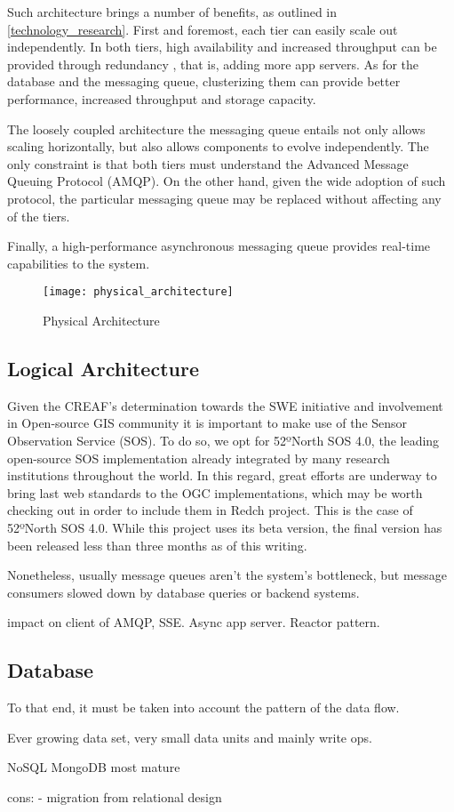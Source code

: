 Such architecture brings a number of benefits, as outlined in \ref{technology_research}. First and foremost, each tier can easily scale out independently. In both tiers, high availability and increased throughput can be provided through redundancy \cite{Antwerp}, that is, adding more app servers. As for the database and the messaging queue, clusterizing them can provide better performance, increased throughput and storage capacity.

The loosely coupled architecture the messaging queue entails not only allows scaling horizontally, but also allows components to evolve independently. The only constraint is that both tiers must understand the Advanced Message Queuing Protocol (AMQP). On the other hand, given the wide adoption of such protocol, the particular messaging queue may be replaced without affecting any of the tiers.

Finally, a high-performance asynchronous messaging queue provides real-time capabilities to the system.

\begin{figure}[ht]
	\centering
	\texttt{[image: physical\_architecture]}
	\caption{Physical Architecture}
	\label{fig:physical_architecture}
\end{figure}

\subsection{Logical Architecture}

Given the CREAF's determination towards the SWE initiative and involvement in Open-source GIS community it is important to make use of the Sensor Observation Service (SOS). To do so, we opt for 52ºNorth SOS 4.0, the leading open-source SOS implementation already integrated by many research institutions throughout the world. In this regard, great efforts are underway to bring last web standards to the OGC implementations, which may be worth checking out in order to include them in Redch project. This is the case of 52ºNorth SOS 4.0. While this project uses its beta version, the final version has been released less than three months as of this writing.




Nonetheless, usually message queues aren't the system's bottleneck, but message consumers slowed down by database queries or backend systems.

impact on client of AMQP, SSE. Async app server. Reactor pattern.

\subsection{Database}

To that end, it must be taken into account the pattern of the data flow.
  
Ever growing data set, very small data units and mainly write ops.


NoSQL
MongoDB most mature

cons: 
- migration from relational design
